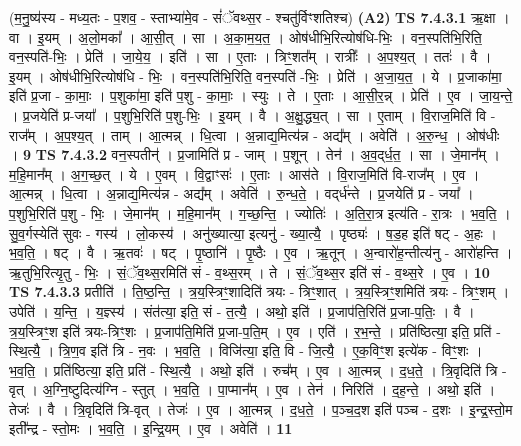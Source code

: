 \documentclass[17pt]{extarticle}
\begin{document}
                      (म॒नु॒ष्य॑स्य - मध्य॒तः - प॒शव॒ - स्ताभ्या॑मे॒व - सं॑ॅवथ्स॒र - श्चतु॑र्विꣳशतिश्च)  \textbf{(A2)} \newline \newline
                                \textbf{ TS 7.4.3.1} \newline
                  ऋ॒क्षा । वा । इ॒यम् । अ॒लो॒मका᳚ । आ॒सी॒त् । सा । अ॒का॒म॒य॒त॒ । ओष॑धीभि॒रित्योष॑धि-भिः॒ । वन॒स्पति॑भि॒रिति॒ वन॒स्पति॑-भिः॒ । प्रेति॑ । जा॒ये॒य॒ । इति॑ । सा । ए॒ताः । त्रिꣳ॒॒शत᳚म् । रात्रीः᳚ । अ॒प॒श्य॒त् । ततः॑ । वै । इ॒यम् । ओष॑धीभि॒रित्योष॑धि - भिः॒ । वन॒स्पति॑भि॒रिति॒ वन॒स्पति॑ -भिः॒ । प्रेति॑ । अ॒जा॒य॒त॒ । ये । प्र॒जाका॑मा॒ इति॑ प्र॒जा - का॒माः॒ । प॒शुका॑मा॒ इति॑ प॒शु - का॒माः॒ । स्युः । ते । ए॒ताः । आ॒सी॒र॒न्न् । प्रेति॑ । ए॒व । जा॒य॒न्ते॒ । प्र॒जयेति॑ प्र-जया᳚ । प॒शुभि॒रिति॑ प॒शु-भिः॒ । इ॒यम् । वै । अ॒क्षु॒द्ध्य॒त् । सा । ए॒ताम् । वि॒राज॒मिति॑ वि - राज᳚म् । अ॒प॒श्य॒त् । ताम् । आ॒त्मन्न् । धि॒त्वा । अ॒न्नाद्य॒मित्य॑न्न - अद्य᳚म् । अवेति॑ । अ॒रु॒न्ध॒ । ओष॑धीः । \textbf{  9} \newline
                  \newline
                                \textbf{ TS 7.4.3.2} \newline
                  वन॒स्पतीन्॑ । प्र॒जामिति॑ प्र - जाम् । प॒शून् । तेन॑ । अ॒व॒द्‌र्ध॒त॒ । सा । जे॒मान᳚म् । म॒हि॒मान᳚म् । अ॒ग॒च्छ॒त् । ये । ए॒वम् । वि॒द्वाꣳसः॑ । ए॒ताः । आस॑ते । वि॒राज॒मिति॑ वि-राज᳚म् । ए॒व । आ॒त्मन्न् । धि॒त्वा । अ॒न्नाद्य॒मित्य॑न्न - अद्य᳚म् । अवेति॑ । रु॒न्ध॒ते॒ । वद्‌र्ध॑न्ते । प्र॒जयेति॑ प्र - जया᳚ । प॒शुभि॒रिति॑ प॒शु - भिः॒ । जे॒मान᳚म् । म॒हि॒मान᳚म् । ग॒च्छ॒न्ति॒ । ज्योतिः॑ । अ॒ति॒रा॒त्र इत्य॑ति - रा॒त्रः । भ॒व॒ति॒ । सु॒व॒र्गस्येति॑ सुवः - गस्य॑ । लो॒कस्य॑ । अनु॑ख्यात्या॒ इत्यनु॑ - ख्या॒त्यै॒ । पृष्ठ्यः॑ । ष॒ड॒ह इति॑ षट् - अ॒हः । भ॒व॒ति॒ । षट् । वै । ऋ॒तवः॑ । षट् । पृ॒ष्ठानि॑ । पृ॒ष्ठैः । ए॒व । ऋ॒तून् । अ॒न्वारो॑ह॒न्तीत्य॑नु - आरो॑हन्ति । ऋ॒तुभि॒रित्यृ॒तु - भिः॒ । सं॒ॅव॒थ्स॒रमिति॑ सं - व॒थ्स॒रम् । ते । सं॒ॅव॒थ्स॒र इति॑ सं - व॒थ्स॒रे । ए॒व । \textbf{  10} \newline
                  \newline
                                \textbf{ TS 7.4.3.3} \newline
                  प्रतीति॑ । ति॒ष्ठ॒न्ति॒ । त्र॒य॒स्त्रिꣳ॒॒शादिति॑ त्रयः - त्रिꣳ॒॒शात् । त्र॒य॒स्त्रिꣳ॒॒शमिति॑ त्रयः - त्रिꣳ॒॒शम् । उपेति॑ । य॒न्ति॒ । य॒ज्ञ्स्य॑ । संत॑त्या॒ इति॒ सं - त॒त्यै॒ । अथो॒ इति॑ । प्र॒जाप॑ति॒रिति॑ प्र॒जा-प॒तिः॒ । वै । त्र॒य॒स्त्रिꣳ॒॒श इति॑ त्रयः-त्रिꣳ॒॒शः । प्र॒जाप॑ति॒मिति॑ प्र॒जा-प॒ति॒म् । ए॒व । एति॑ । र॒भ॒न्ते॒ । प्रति॑ष्ठित्या॒ इति॒ प्रति॑ - स्थि॒त्यै॒ । त्रि॒ण॒व इति॑ त्रि - न॒वः । भ॒व॒ति॒ । विजि॑त्या॒ इति॒ वि - जि॒त्यै॒ । ए॒क॒विꣳ॒॒श इत्ये॑क - विꣳ॒॒शः । भ॒व॒ति॒ । प्रति॑ष्ठित्या॒ इति॒ प्रति॑ - स्थि॒त्यै॒ । अथो॒ इति॑ । रुच᳚म् । ए॒व । आ॒त्मन्न् । द॒ध॒ते॒ । त्रि॒वृदिति॑ त्रि - वृत् । अ॒ग्नि॒ष्टुदित्य॑ग्नि - स्तुत् । भ॒व॒ति॒ । पा॒प्मान᳚म् । ए॒व । तेन॑ । निरिति॑ । द॒ह॒न्ते॒ । अथो॒ इति॑ । तेजः॑ । वै । त्रि॒वृदिति॑ त्रि-वृत् । तेजः॑ । ए॒व । आ॒त्मन्न् । द॒ध॒ते॒ । प॒ञ्च॒द॒श इति॑ पञ्च - द॒शः । इ॒न्द्र॒स्तो॒म इती᳚न्द्र - स्तो॒मः । भ॒व॒ति॒ । इ॒न्द्रि॒यम् । ए॒व । अवेति॑ । \textbf{  11} \newline
\end{document}
